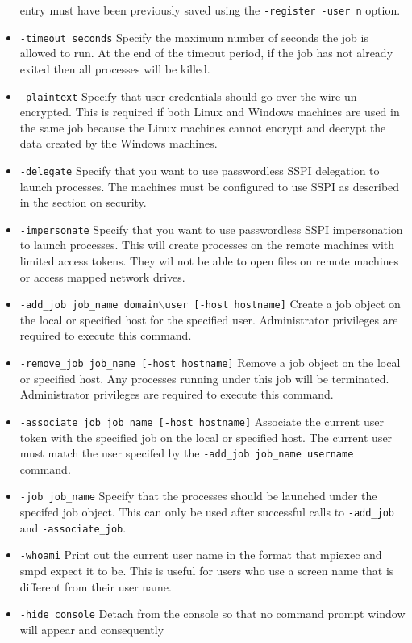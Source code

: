 \documentclass[dvipdfm,11pt]{article}
\begin{document}
\begin{itemize}
entry must have been previously saved using the \texttt{-register -user n} option.
\item \texttt{-timeout seconds}
Specify the maximum number of seconds the job is allowed to run.  At the end of
the timeout period, if the job has not already exited then all processes will
be killed.
\item \texttt{-plaintext}
Specify that user credentials should go over the wire un-encrypted.  This is
required if both Linux and Windows machines are used in the same job because
the Linux machines cannot encrypt and decrypt the data created by the Windows
machines.
\item \texttt{-delegate}
Specify that you want to use passwordless SSPI delegation to launch processes.
The machines must be configured to use SSPI as described in the section on 
security.
\item \texttt{-impersonate}
Specify that you want to use passwordless SSPI impersonation to launch processes.
This will create processes on the remote machines with limited access tokens.
They wil not be able to open files on remote machines or access mapped network
drives.
\item \texttt{-add\_job job\_name domain$\backslash$user [-host hostname]}
Create a job object on the local or specified host for the specified user.
Administrator privileges are required to execute this command.
\item \texttt{-remove\_job job\_name [-host hostname]}
Remove a job object on the local or specified host.  Any processes running under
this job will be terminated.  Administrator privileges are required to execute
this command.
\item \texttt{-associate\_job job\_name [-host hostname]}
Associate the current user token with the specified job on the local or specified
host.  The current user must match the user specifed by the \texttt{-add\_job job\_name username}
command.
\item \texttt{-job job\_name}
Specify that the processes should be launched under the specifed job object.
This can only be used after successful calls to \texttt{-add\_job} and \texttt{-associate\_job}.
\item \texttt{-whoami}
Print out the current user name in the format that mpiexec and smpd expect it to be.
This is useful for users who use a screen name that is different from their user
name.
\item \texttt{-hide\_console}
Detach from the console so that no command prompt window will appear and consequently

\end{itemize}
\end{document}
